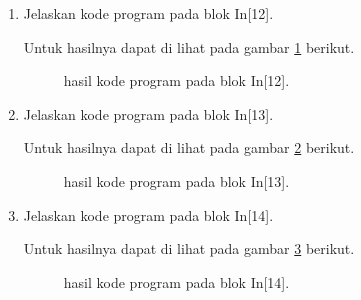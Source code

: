 \begin{enumerate}
\item Jelaskan kode program pada blok  In[12].

Untuk hasilnya dapat di lihat pada gambar \ref{c152} berikut.
\begin{figure}[!htbp]
      \caption{hasil kode program pada blok  In[12].}
      \label{c152}
      \end{figure}

\item Jelaskan kode program pada blok  In[13].

Untuk hasilnya dapat di lihat pada gambar \ref{c153} berikut.
\begin{figure}[!htbp]
      \caption{hasil kode program pada blok  In[13].}
      \label{c153}
      \end{figure}

\item Jelaskan kode program pada blok  In[14].

Untuk hasilnya dapat di lihat pada gambar \ref{c154} berikut.
\begin{figure}[!htbp]
      \caption{hasil kode program pada blok  In[14].}
      \label{c154}
      \end{figure}


\end{enumerate}
